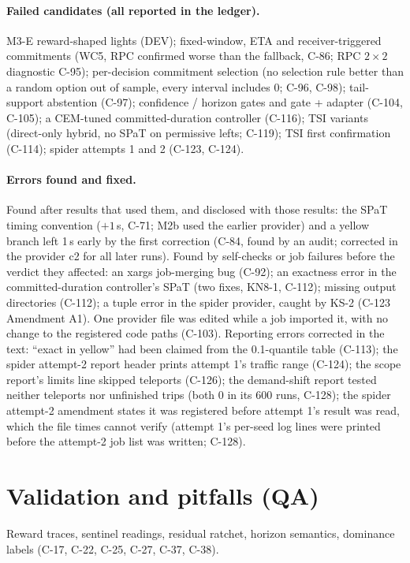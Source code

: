 \documentclass[11pt]{article}
\begin{document}
\paragraph{Failed candidates (all reported in the ledger).} M3-E reward-shaped lights (DEV); fixed-window, ETA and receiver-triggered
commitments (WC5, RPC confirmed worse than the fallback, C-86; RPC $2\times2$ diagnostic C-95); per-decision commitment selection (no
selection rule better than a random option out of sample, every interval includes 0; C-96, C-98); tail-support abstention (C-97);
confidence / horizon gates and gate + adapter (C-104, C-105); a CEM-tuned
committed-duration controller (C-116); TSI variants (direct-only hybrid, no SPaT on permissive lefts; C-119); TSI first confirmation
(C-114); spider attempts 1 and 2 (C-123, C-124).
\paragraph{Errors found and fixed.} Found after results that used them, and disclosed with those results: the SPaT timing convention
($+1$\,s, C-71; M2b used the earlier provider) and a yellow branch left 1\,s early by the first correction (C-84, found by an audit;
corrected in the provider c2 for all later runs). Found by self-checks or job failures before the verdict they affected: an xargs job-merging bug (C-92); an exactness error in the committed-duration controller's SPaT (two fixes, KN8-1, C-112);
missing output directories (C-112); a tuple error in the spider provider, caught by KS-2 (C-123 Amendment A1). One provider file was edited
while a job imported it, with no change to the registered code paths (C-103).
Reporting errors corrected in the text: ``exact in yellow'' had been claimed from the 0.1-quantile table (C-113); the spider attempt-2
report header prints attempt 1's traffic range (C-124); the scope report's limits line skipped teleports (C-126); the demand-shift report tested neither teleports nor unfinished trips (both 0
in its 600 runs, C-128); the spider attempt-2 amendment states it was registered before attempt 1's result was read, which the file
times cannot verify (attempt 1's per-seed log lines were printed before the attempt-2 job list was written; C-128).
\section{Validation and pitfalls (QA)}
Reward traces, sentinel readings, residual ratchet, horizon semantics, dominance labels (C-17, C-22, C-25, C-27, C-37, C-38).
\end{document}

